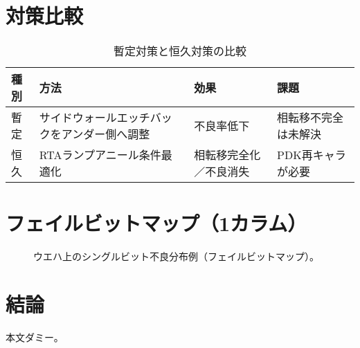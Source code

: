 \documentclass[conference]{IEEEtran}
\begin{document}
\section{対策比較}
\begin{table}[H]
\centering
\caption{暫定対策と恒久対策の比較}
\label{tab:countermeasures}
\begin{tabularx}{\columnwidth}{l X X X}
\toprule
種別 & 方法 & 効果 & 課題 \\
\midrule
暫定 & サイドウォールエッチバックをアンダー側へ調整 &
不良率低下 &
相転移不完全は未解決 \\
恒久 & RTAランプアニール条件最適化 &
相転移完全化／不良消失 &
PDK再キャラが必要 \\
\bottomrule
\end{tabularx}
\end{table}

\section{フェイルビットマップ（1カラム）}
\begin{figure}[!t]
\centering
{}
\caption{ウエハ上のシングルビット不良分布例（フェイルビットマップ）。}
\label{fig:failmap}
\end{figure}

\section{結論}
本文ダミー。
\end{document}
